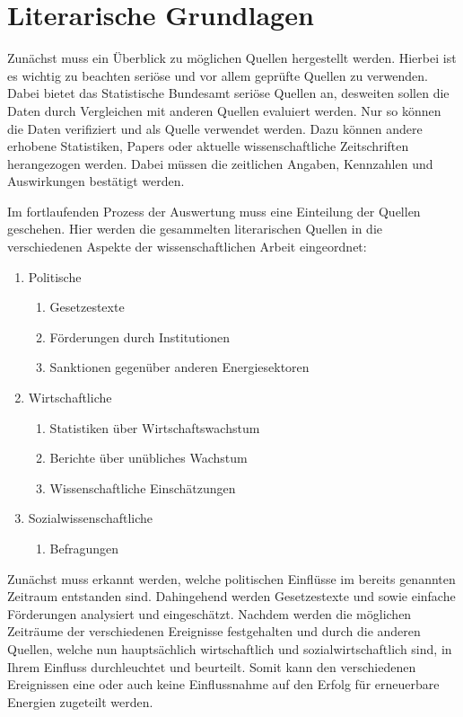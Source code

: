 \documentclass[12pt,a4paper]{article}
\begin{document}
\section*{Literarische Grundlagen}
Zunächst muss ein Überblick zu möglichen Quellen hergestellt werden. 
Hierbei ist es wichtig zu beachten seriöse und vor allem geprüfte Quellen zu verwenden. 
Dabei bietet das Statistische Bundesamt seriöse Quellen an, desweiten sollen die Daten 
durch Vergleichen mit anderen Quellen evaluiert werden. Nur so können die Daten verifiziert 
und als Quelle verwendet werden. Dazu können andere erhobene Statistiken, Papers oder 
aktuelle wissenschaftliche Zeitschriften herangezogen werden. Dabei müssen die zeitlichen 
Angaben, Kennzahlen und Auswirkungen bestätigt werden. 

Im fortlaufenden Prozess der Auswertung muss eine Einteilung der Quellen geschehen. 
Hier werden die gesammelten literarischen Quellen in die verschiedenen Aspekte der 
wissenschaftlichen Arbeit eingeordnet: 

\begin{enumerate}
	\item Politische
	\begin{enumerate}
		\item Gesetzestexte
		\item Förderungen durch Institutionen
		\item Sanktionen gegenüber anderen Energiesektoren 
	\end{enumerate}
	\item Wirtschaftliche
	\begin{enumerate}
		\item Statistiken über Wirtschaftswachstum 
		\item Berichte über unübliches Wachstum  
		\item Wissenschaftliche Einschätzungen 
	\end{enumerate}
	\item Sozialwissenschaftliche
	\begin{enumerate}
		\item Befragungen
	\end{enumerate}
\end{enumerate}

Zunächst muss erkannt werden, welche politischen Einflüsse im bereits genannten Zeitraum 
entstanden sind. Dahingehend werden Gesetzestexte und sowie einfache Förderungen analysiert 
und eingeschätzt. Nachdem werden die möglichen Zeiträume der verschiedenen Ereignisse 
festgehalten und durch die anderen Quellen, welche nun hauptsächlich wirtschaftlich und 
sozialwirtschaftlich sind, in Ihrem Einfluss durchleuchtet und beurteilt. 
Somit kann den verschiedenen Ereignissen eine oder auch keine Einflussnahme auf den Erfolg 
für erneuerbare Energien zugeteilt werden. 
\end{document}
